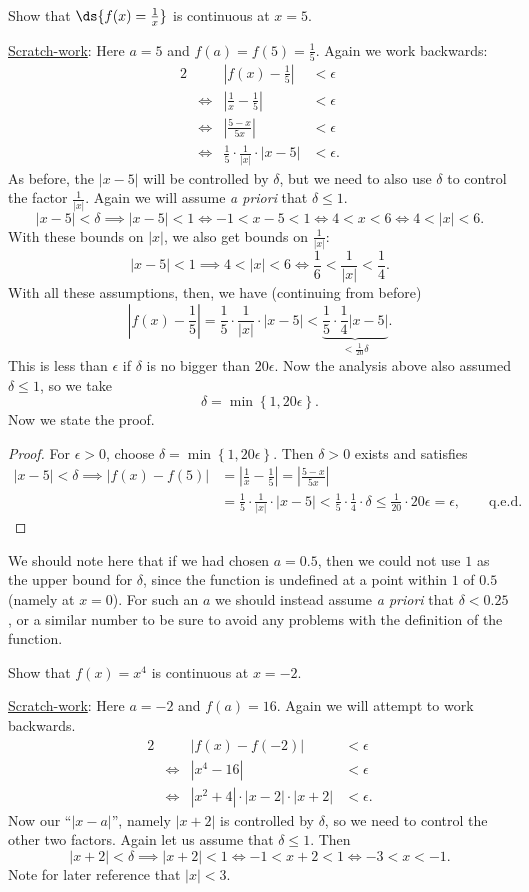 \newpage
\bex Show that $\ds{f(x)=\frac1x}$ is continuous at $x=5$.
\label{ReciprocalContinuityExample}

\underline{Scratch-work}: Here $a=5$ and $f(a)=f(5)=\frac15$.
Again we work backwards:
\begin{alignat*}{2}
&&\left|f(x)-\frac15\right|&<\epsilon\\
&\iff&\left|\frac1x-\frac15\right|&<\epsilon\\
&\iff&\left|\frac{5-x}{5x}\right|&<\epsilon\\
&\iff&\frac15\cdot\frac1{|x|}\cdot|x-5|&<\epsilon.
\end{alignat*}
As before, the $|x-5|$ will be controlled by $\delta$,
but we need to also use $\delta$ to control the factor
$\frac1{|x|}$.  Again we will assume {\it a priori}
that $\delta\le1$.
$$|x-5|<\delta\implies|x-5|<1\iff -1<x-5<1
\iff 4<x<6\iff 4<|x|<6.$$
With these bounds on $|x|$, we also get bounds on $\frac1{|x|}$:
$$|x-5|<1\implies4<|x|<6\iff\frac16<\frac1{|x|}<\frac14.$$
With all these assumptions, then, we have (continuing from before)
$$\left|f(x)-\frac15\right|=\frac15\cdot\frac1{|x|}\cdot|x-5|<
\underbrace{\frac15\cdot\frac14|x-5|}_{<\frac1{20}\delta}.$$
This is less than $\epsilon$
if $\delta$ is no bigger than $20\epsilon$.  Now the 
analysis above also assumed $\delta\le 1$, so
we take
$$\delta=\min\left\{1,20\epsilon\right\}.$$
Now we state the proof.

\begin{proof} For $\epsilon>0$, choose
 $\delta=\min\left\{1,20\epsilon\right\}.$
Then $\delta>0$ exists and satisfies
\begin{align*}|x-5|<\delta\implies
|f(x)-f(5)|&=\left|\frac1x-\frac15\right|=
\left|\frac{5-x}{5x}\right|\\
&=\frac15\cdot\frac1{|x|}\cdot|x-5|
<\frac15\cdot\frac14\cdot\delta\le\frac{1}{20}\cdot20\epsilon
=\epsilon, \qquad\text{q.e.d.}
\end{align*}
\end{proof}
\eex
We should note here that if we had chosen $a=0.5$, then
we could not use $1$ as the upper bound for $\delta$,
since the function is undefined at a point
within $1$ of $0.5$ (namely at $x=0$).  For such an
$a$ we should instead assume {\it a priori} that
$\delta<0.25$, or a similar number to be sure
to avoid any problems with the definition of the function.

\newpage
\bex Show that $f(x)=x^4$ is continuous at $x=-2$.

\underline{Scratch-work}: Here $a=-2$ and $f(a)=16$.
Again we will attempt to work backwards.
\begin{alignat*}{2}
&&|f(x)-f(-2)|&<\epsilon\\
&\iff&|x^4-16|&<\epsilon\\
&\iff&|x^2+4|\cdot|x-2|\cdot|x+2|&<\epsilon.\end{alignat*}
Now our ``$|x-a|$'', namely $|x+2|$ 
is controlled by $\delta$, so we need
to control the other two factors.  Again let us assume
that $\delta\le1$. Then
$$|x+2|<\delta\implies |x+2|<1\iff
-1<x+2<1\iff -3<x<-1.$$
Note for later reference that $|x|<3$.

